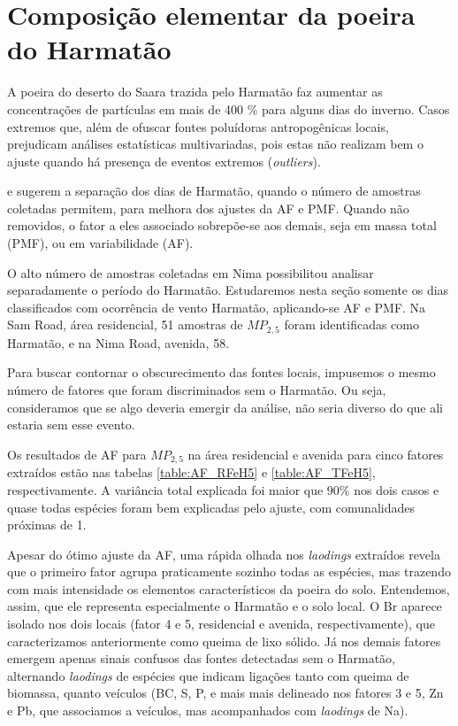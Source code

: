 \newpage
\section{Composição elementar da poeira do Harmatão}

A poeira do deserto do Saara trazida pelo Harmatão faz aumentar as concentrações
de partículas em mais de 400 \% para alguns dias do inverno. Casos extremos 
que, além de ofuscar fontes poluídoras antropogênicas locais, prejudicam 
análises estatísticas multivariadas, pois estas não realizam bem o ajuste 
quando há presença de eventos extremos (\textit{outliers}).

\citet{aboh2009} e \citet{ofosu2013} sugerem a separação dos dias de Harmatão, 
quando o número de amostras coletadas permitem, para melhora dos ajustes da AF e PMF. 
Quando não removidos, o fator a eles associado sobrepõe-se aos demais, seja em 
massa total (PMF), ou em variabilidade (AF).

O alto número de amostras coletadas em Nima possibilitou analisar separadamente 
o período do Harmatão. Estudaremos nesta seção somente os dias classificados 
com ocorrência de vento Harmatão, aplicando-se AF e PMF. 
Na Sam Road, área residencial, 51 amostras de $MP_{2,5}$ foram identificadas 
como Harmatão, e na Nima Road, avenida, 58. 

Para buscar contornar o obscurecimento das fontes locais, impusemos o mesmo 
número de fatores que foram discriminados sem o Harmatão. Ou seja, consideramos 
que se algo deveria emergir da análise, não seria diverso do que ali estaria sem
esse evento.

Os resultados de AF para $MP_{2,5}$ na área residencial e avenida para cinco 
fatores extraídos estão nas tabelas \ref{table:AF_RFeH5} e \ref{table:AF_TFeH5},
respectivamente.  A variância total explicada foi maior que 90\% nos dois  
casos e quase todas espécies foram bem explicadas pelo ajuste, com comunalidades 
próximas de 1. 

Apesar do ótimo ajuste da AF, uma rápida olhada nos \textit{laodings} extraídos
revela que o primeiro fator agrupa praticamente sozinho todas as espécies, 
mas trazendo com mais intensidade os elementos característicos da poeira do solo.
Entendemos, assim, que ele representa especialmente o Harmatão e o solo local. 
O Br aparece isolado nos dois locais (fator 4 e 5, residencial e avenida, 
respectivamente), que caracterizamos anteriormente como queima de lixo sólido. 
Já nos demais fatores emergem apenas sinais confusos das fontes detectadas sem 
o Harmatão, alternando \textit{laodings} de espécies que indicam ligações tanto 
com queima de biomassa, quanto veículos (BC, S, P, e mais mais delineado nos 
fatores 3 e 5, Zn e Pb, que associamos a veículos, mas acompanhados com 
\textit{laodings} de Na).

